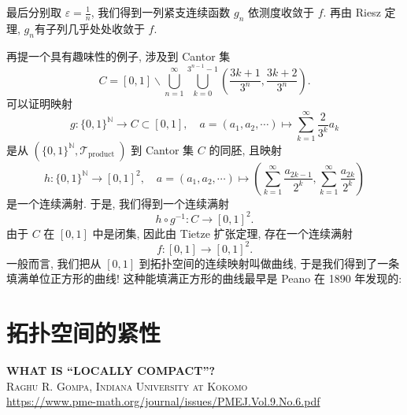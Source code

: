 \documentclass[options]{article}
\begin{document}
最后分别取 $\varepsilon=\frac{1}{n}$, 我们得到一列紧支连续函数 $g_n$ 依测度收敛于 $f$. 再由 Riesz 定理, $g_n$有子列几乎处处收敛于 $f$.

\vfill

再提一个具有趣味性的例子, 涉及到 Cantor 集
\[
		C=[0,1] \backslash \bigcup_{n=1}^{\infty} \bigcup_{k=0}^{3^{n-1}-1}\left(\frac{3 k+1}{3^n}, \frac{3 k+2}{3^n}\right) .
\]
可以证明映射
\[
		g:\{0,1\}^{\mathbb{N}} \rightarrow C \subset[0,1], \quad a=\left(a_1, a_2, \cdots\right) \mapsto \sum_{k=1}^{\infty} \frac{2}{3^k} a_k
\]
是从 $\left(\{0,1\}^{\mathbb{N}}, \mathscr{T}_{\text {product }}\right)$ 到 Cantor 集 $C$ 的同胚, 且映射
\[
		h:\{0,1\}^{\mathbb{N}} \rightarrow[0,1]^2, \quad a=\left(a_1, a_2, \cdots\right) \mapsto\left(\sum_{k=1}^{\infty} \frac{a_{2 k-1}}{2^k}, \sum_{k=1}^{\infty} \frac{a_{2 k}}{2^k}\right)
\]
是一个连续满射. 于是, 我们得到一个连续满射
\[
		h \circ g^{-1}: C \rightarrow[0,1]^2 .
\]
由于 $C$ 在 $[0,1]$ 中是闭集, 因此由 Tietze 扩张定理, 存在一个连续满射
\[
		f:[0,1] \rightarrow[0,1]^2 .
\]
一般而言, 我们把从 $[0,1]$ 到拓扑空间的连续映射叫做曲线, 于是我们得到了一条填满单位正方形的曲线! 这种能填满正方形的曲线最早是 Peano 在 1890 年发现的:

\section{拓扑空间的紧性}
\begin{center}{\bf\Huge{WHAT IS ``LOCALLY COMPACT''?
		}}\\
	{{\scshape{Raghu R. Gompa, Indiana University at Kokomo}}\\\url{https://www.pme-math.org/journal/issues/PMEJ.Vol.9.No.6.pdf}}
\end{center}
\end{document}
